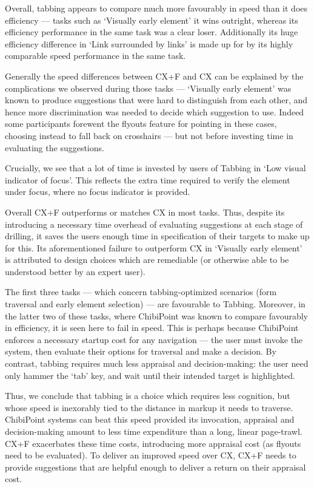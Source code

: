 \documentclass[11pt,openright,a4paper]{report}
\begin{document}
Overall, tabbing appears to compare much more favourably in speed than it does efficiency --- tasks such as `Visually early element' it wins outright, whereas its efficiency performance in the same task was a clear loser. Additionally its huge efficiency difference in `Link surrounded by links' is made up for by its highly comparable speed performance in the same task.

Generally the speed differences between CX+F and CX can be explained by the complications we observed during those tasks --- `Visually early element' was known to produce suggestions that were hard to distinguish from each other, and hence more discrimination was needed to decide which suggestion to use. Indeed some participants forewent the flyouts feature for pointing in these cases, choosing instead to fall back on crosshairs --- but not before investing time in evaluating the suggestions.

Crucially, we see that a lot of time is invested by users of Tabbing in `Low visual indicator of focus'. This reflects the extra time required to verify the element under focus, where no focus indicator is provided.

Overall CX+F outperforms or matches CX in most tasks. Thus, despite its introducing a necessary time overhead of evaluating suggestions at each stage of drilling, it saves the users enough time in specification of their targets to make up for this. Its aforementioned failure to outperform CX in `Visually early element' is attributed to design choices which are remediable (or otherwise able to be understood better by an expert user).

The first three tasks --- which concern tabbing-optimized scenarios (form traversal and early element selection) --- are favourable to Tabbing. Moreover, in the latter two of these tasks, where ChibiPoint was known to compare favourably in efficiency, it is seen here to fail in speed. This is perhaps because ChibiPoint enforces a necessary startup cost for any navigation --- the user must invoke the system, then evaluate their options for traversal and make a decision. By contrast, tabbing requires much less appraisal and decision-making: the user need only hammer the `tab' key, and wait until their intended target is highlighted.

Thus, we conclude that tabbing is a choice which requires less cognition, but whose speed is inexorably tied to the distance in markup it needs to traverse. ChibiPoint systems can beat this speed provided its invocation, appraisal and decision-making amount to less time expenditure than a long, linear page-trawl. CX+F exacerbates these time costs, introducing more appraisal cost (as flyouts need to be evaluated). To deliver an improved speed over CX, CX+F needs to provide suggestions that are helpful enough to deliver a return on their appraisal cost.
\end{document}
